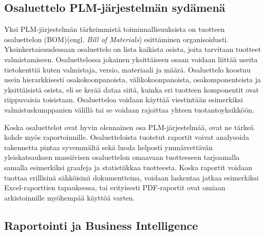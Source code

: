 \subsection{Osaluettelo PLM-järjestelmän sydämenä} \label{Osaluettelo PLM-järjestelmän sydämenä}

Yksi PLM-järjestelmän tärkeimmistä toiminnallisuuksista on tuotteen osaluettelon (BOM)(engl. \textit{Bill of Materials}) esittäminen organisoidusti.  \cite{david_what_2016} Yksinkertaisuudessaan osaluettelo on lista kaikista osista, joita tarvitaan tuotteet valmistamiseen. Osaluettelossa jokainen yksittäiseen osaan voidaan liittää useita tietokenttiä kuten valmistaja, versio, materiaali ja määrä. Osaluettelo koostuu usein hierarkkisesti osakokoonpanoista, välikokoonpanoista, osakomponenteista ja yksittäisistä osista, eli se kerää dataa siitä, kuinka eri tuotteen komponentit ovat riippuvaisia toisistaan. Osaluetteloa voidaan käyttää viestintään esimerkiksi valmistuskumppanien välillä tai se voidaan rajoittaa yhteen tuotantoyksikköön.  \cite{jones_visualizing_2023}

Koska osaluettelot ovat hyvin olennainen osa PLM-järjestelmää, ovat ne tärkeä kohde myös raportoinnille. \cite{german_challenge_2016} Osaluetteloista tuotetut raportit voivat analysoida rakennetta pintaa syvemmältä sekä luoda helposti ymmärrettävän yleiskatsauksen massiivisen osaluettelon omaavaan tuotteeseen tarjoamalla samalla esimerkiksi graafeja ja statistiikkaa tuotteesta. Koska raportit voidaan tuottaa erillisinä sähköisinä dokumentteina, voidaan laskentaa jatkaa esimerkiksi Excel-raporttien tapauksessa, tai erityisesti PDF-raportit ovat omiaan arkistoinnille myöhempää käyttöä varten.

\subsection{Raportointi ja Business Intelligence} \label{Raportointi ja Business Intelligence}

